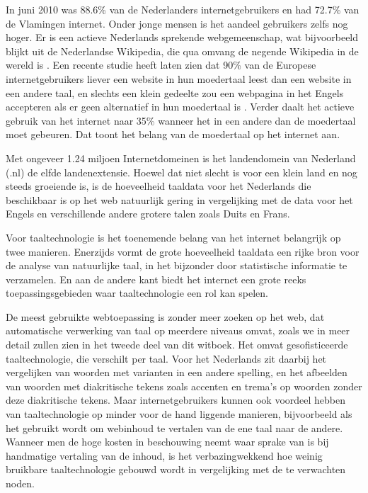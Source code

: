 \documentclass[]{../../metanetpaper}
\begin{document}
\begin{multicols}{2}
    In juni 2010 was 88.6\% van de Nederlanders  internetgebruikers \cite{Internetworldstats} en had 72.7\% van de Vlamingen \cite{VRIND} internet. Onder jonge mensen is het aandeel gebruikers zelfs nog hoger. Er is een actieve Nederlands sprekende webgemeenschap, wat bijvoorbeeld blijkt uit de Nederlandse Wikipedia, die qua omvang de negende Wikipedia in de wereld is \cite{Wikipedia}.  Een recente studie heeft laten zien dat 90\% van de Europese internetgebruikers liever een website in hun moedertaal leest dan een website in een andere taal, en slechts een klein gedeelte zou een webpagina in het Engels accepteren als er geen alternatief in hun moedertaal is \cite{Flash}. Verder daalt het actieve gebruik van het internet naar 35\% wanneer het in een andere dan de moedertaal moet gebeuren. Dat toont het belang van de moedertaal op het internet aan.


    Met ongeveer 1.24 miljoen Internetdomeinen \cite{Webstats} is het landendomein van Nederland (.nl) de elfde landenextensie. Hoewel dat niet slecht is voor een klein land en nog steeds groeiende is, is de hoeveelheid taaldata voor het Nederlands die beschikbaar is op het web natuurlijk gering in vergelijking met de data voor het Engels en verschillende andere grotere talen zoals Duits en Frans.

    Voor taaltechnologie is het toenemende belang van het internet belangrijk op twee manieren. Enerzijds vormt de grote hoeveelheid taaldata een rijke bron voor de analyse van natuurlijke taal, in het bijzonder door statistische informatie te verzamelen. En aan de andere kant biedt het internet een grote reeks toepassingsgebieden waar taaltechnologie een rol kan spelen.

    De meest gebruikte webtoepassing is zonder meer zoeken op het web, dat automatische verwerking van taal op meerdere niveaus omvat, zoals we in meer detail zullen zien in het tweede deel van dit witboek. Het omvat gesofisticeerde taaltechnologie, die verschilt per taal. Voor het Nederlands zit daarbij het vergelijken van woorden met varianten in een andere spelling, en het afbeelden van woorden met diakritische tekens zoals accenten en trema's op woorden zonder deze diakritische tekens. Maar internetgebruikers kunnen ook voordeel hebben van taaltechnologie op minder voor de hand liggende manieren, bijvoorbeeld als het gebruikt wordt om webinhoud te vertalen van de ene taal naar de andere. Wanneer men de hoge kosten in beschouwing neemt waar sprake van is bij handmatige vertaling van de inhoud, is het verbazingwekkend hoe weinig bruikbare taaltechnologie gebouwd wordt in vergelijking met de te verwachten noden.


\end{multicols}
\end{document}
